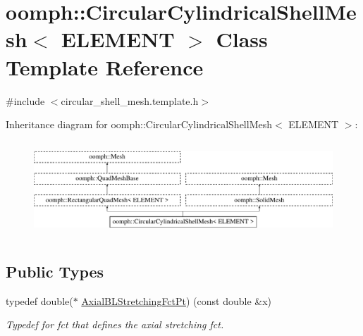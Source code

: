 \hypertarget{classoomph_1_1CircularCylindricalShellMesh}{}\section{oomph\+:\+:Circular\+Cylindrical\+Shell\+Mesh$<$ E\+L\+E\+M\+E\+NT $>$ Class Template Reference}
\label{classoomph_1_1CircularCylindricalShellMesh}


{\ttfamily \#include $<$circular\+\_\+shell\+\_\+mesh.\+template.\+h$>$}

Inheritance diagram for oomph\+:\+:Circular\+Cylindrical\+Shell\+Mesh$<$ E\+L\+E\+M\+E\+NT $>$\+:\begin{figure}[H]
\begin{center}
\leavevmode
\includegraphics[height=3.601286cm]{classoomph_1_1CircularCylindricalShellMesh}
\end{center}
\end{figure}
\subsection*{Public Types}
\begin{DoxyCompactItemize}
\item 
typedef double($\ast$ \hyperlink{classoomph_1_1CircularCylindricalShellMesh_a770336fa72e8911f31b9fe3f70197a51}{Axial\+B\+L\+Stretching\+Fct\+Pt}) (const double \&x)
\begin{DoxyCompactList}\small\item\em Typedef for fct that defines the axial stretching fct. \end{DoxyCompactList}\end{DoxyCompactItemize}
